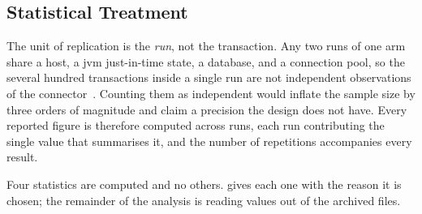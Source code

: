 \subsection{Statistical Treatment}\label{subsec:analysis-statistics}

The unit of replication is the \emph{run}, not the transaction. Any two runs of one arm share a host, a \gls{jvm} just-in-time state, a database, and a connection pool, so the several hundred transactions inside a single run are not independent observations of the connector~\citep{jain1991art, hoefler2015scientific}. Counting them as independent would inflate the sample size by three orders of magnitude and claim a precision the design does not have. Every reported figure is therefore computed across runs, each run contributing the single value that summarises it, and the number of repetitions accompanies every result.

Four statistics are computed and no others.  gives each one with the reason it is chosen; the remainder of the analysis is reading values out of the archived files.

